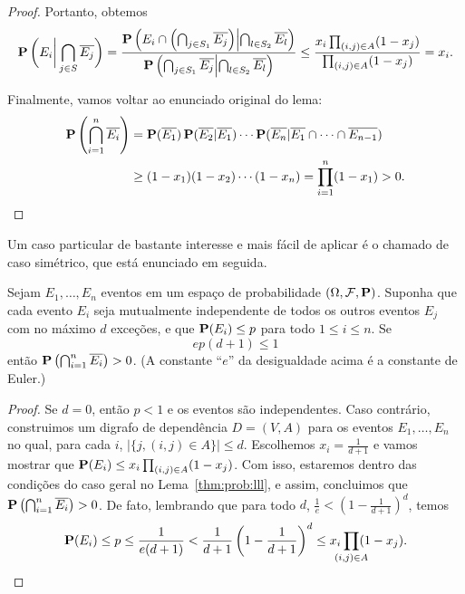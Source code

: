 \begin{proof}
Portanto, obtemos
\begin{align*}
  \operatorname{\mathbf{P}}\bigg( E_i \bigg| \bigcap_{j \in S} \overline{E_j} \bigg) = \frac{\operatorname{\mathbf{P}}\left( E_i \cap \left(\bigcap_{j \in S_1} \overline{E_j} \right) \middle| \bigcap_{l \in S_2} \overline{E_l} \right)}{\operatorname{\mathbf{P}}\left( \bigcap_{j \in S_1} \overline{E_j} \middle| \bigcap_{l \in S_2} \overline{E_l} \right)} \leq \frac{x_i\prod_{(i,j) \in A}(1-x_j)}{\prod_{(i,j) \in A}(1-x_j)} = x_i.
\end{align*}

Finalmente, vamos voltar ao enunciado original do lema:
\begin{align*}
\operatorname{\mathbf{P}} \left( \bigcap_{i = 1}^n \overline{E_i} \right) &= \operatorname{\mathbf{P}} (\overline{E_1}) \operatorname{\mathbf{P}} (\overline{E_2} | \overline{E_1} ) \cdots \operatorname{\mathbf{P}}( \overline{E_n} | \overline{E_1} \cap \dots \cap \overline{E_{n-1}}) \\
&\geq (1 - x_1)(1 - x_2)\cdots(1-x_n) = \prod_{i=1}^n(1 - x_1) > 0. \qedhere
\end{align*}
\end{proof}

Um caso particular de bastante interesse e mais fácil de aplicar é o chamado de caso simétrico, que está enunciado em seguida.

\begin{lemma}
\label{thm:prob:llls}
Sejam $E_1, \dots, E_n$ eventos em um espaço de probabilidade $(\Omega, \mathcal{F}, \operatorname{\mathbf{P}})$. Suponha que cada evento $E_i$ seja mutualmente independente de todos os outros eventos $E_j$ com no máximo $d$ exceções, e que $\operatorname{\mathbf{P}}(E_i) \leq p$ para todo $1 \leq i \leq n$. Se
\[ ep(d+1) \leq 1 \]
então $\operatorname{\mathbf{P}} \left( \bigcap_{i = 1}^n \overline{E_i} \right) > 0$. (A constante ``$e$'' da desigualdade acima é a constante de Euler.)
\end{lemma}
\begin{proof}
Se $d = 0$, então $p < 1$ e os eventos são independentes. Caso contrário, construimos um digrafo de dependência $D = (V,A)$ para os eventos $E_1, \dots, E_n$ no qual, para cada $i$, $|\{j, (i,j) \in A\}| \leq d$. Escolhemos $x_i = \frac{1}{d+1}$ e vamos mostrar que $\operatorname{\mathbf{P}} (E_i) \leq x_i \prod_{(i,j) \in A}(1-x_j)$.
Com isso, estaremos dentro das condições do caso geral no Lema~\ref{thm:prob:lll}, e assim, concluimos que $\operatorname{\mathbf{P}} \left( \bigcap_{i = 1}^n \overline{E_i} \right) > 0$. De fato, lembrando que para todo $d$, $\frac{1}{e} < (1 - \frac{1}{d+1})^d$, temos
\[ \prob(E_i) \leq p \leq \frac{1}{e(d+1)} < \frac{1}{d+1}\left(1 - \frac{1}{d+1} \right)^d \leq x_i \prod_{\mathclap{(i,j) \in A}}(1-x_j). \qedhere\]
\end{proof}

